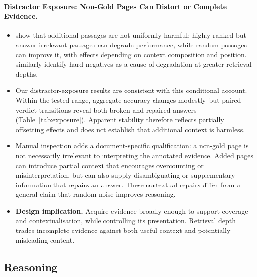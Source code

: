 \paragraph{Distractor Exposure: Non-Gold Pages Can Distort or Complete Evidence.}
\begin{itemize}
    \item \citeauthor{cuconasu2024power} show that additional passages are not uniformly harmful: highly ranked but answer-irrelevant passages can degrade performance, while random passages can improve it, with effects depending on context composition and position. \citeauthor{jin2025long} similarly identify hard negatives as a cause of degradation at greater retrieval depths.

    \item Our distractor-exposure results are consistent with this conditional account. Within the tested range, aggregate accuracy changes modestly, but paired verdict transitions reveal both broken and repaired answers (Table~\ref{tab:exposure}). Apparent stability therefore reflects partially offsetting effects and does not establish that additional context is harmless.

    \item Manual inspection adds a document-specific qualification: a non-gold page is not necessarily irrelevant to interpreting the annotated evidence. Added pages can introduce partial context that encourages overcounting or misinterpretation, but can also supply disambiguating or supplementary information that repairs an answer. These contextual repairs differ from a general claim that random noise improves reasoning.

    \item \textbf{Design implication.} Acquire evidence broadly enough to support coverage and contextualisation, while controlling its presentation. Retrieval depth trades incomplete evidence against both useful context and potentially misleading content.
\end{itemize}

\subsection{Reasoning}
\label{sec:findings_reasoning}

